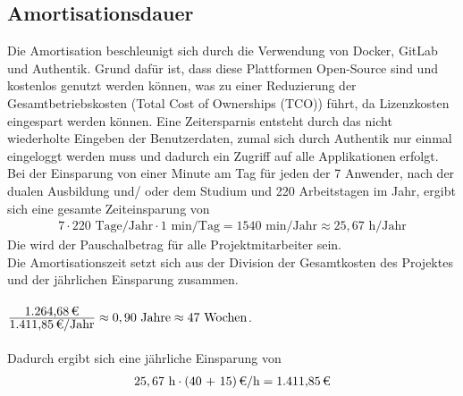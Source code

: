 \subsection{Amortisationsdauer}
\label{sec:Amortisationsdauer}
Die Amortisation beschleunigt sich durch die Verwendung von Docker, GitLab und Authentik. 
Grund dafür ist, dass diese Plattformen Open-Source sind und kostenlos genutzt werden können, was zu einer Reduzierung der  
Gesamtbetriebskosten (Total Cost of Ownerships (\acs{TCO})) führt, da Lizenzkosten eingespart werden können.  
Eine Zeitersparnis entsteht durch das nicht wiederholte Eingeben der Benutzerdaten, zumal sich durch Authentik nur 
einmal eingeloggt werden muss und dadurch ein Zugriff auf alle Applikationen erfolgt.
\\Bei der Einsparung von einer Minute am Tag für jeden der 7 Anwender, nach der dualen Ausbildung und/ oder dem Studium und 
220 Arbeitstagen im Jahr, ergibt sich eine gesamte Zeiteinsparung von 
\begin{eqnarray}
7 \cdot 220 \mbox{ Tage/Jahr} \cdot 1 \mbox{ min/Tag} = 1540 \mbox{ min/Jahr} \approx 25,67 \mbox{ h/Jahr} 
\end{eqnarray}
Die  wird der Pauschalbetrag für alle Projektmitarbeiter sein.
\\Die Amortisationszeit setzt sich aus der Division der Gesamtkosten des Projektes und der jährlichen 
Einsparung zusammen.
\\\\$\frac{\eur{1.264,68}}{\eur{1.411,85}\mbox{/Jahr}} \approx 0,90 \mbox{ Jahre} \approx 47 \mbox{ Wochen}$.\\
\\Dadurch ergibt sich eine jährliche Einsparung von 
\begin{eqnarray}
25,67 \mbox{ h} \cdot \eur{(40 + 15)}{\mbox{/h}} = \eur{1.411,85}
\end{eqnarray}

